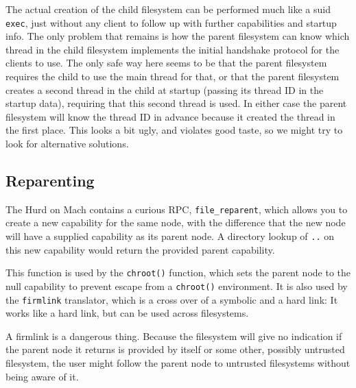 The actual creation of the child filesystem can be performed much like
a suid \texttt{exec}, just without any client to follow up with
further capabilities and startup info.  The only problem that remains
is how the parent filesystem can know which thread in the child
filesystem implements the initial handshake protocol for the clients
to use.  The only safe way here seems to be that the parent filesystem
requires the child to use the main thread for that, or that the parent
filesystem creates a second thread in the child at startup (passing
its thread ID in the startup data), requiring that this second thread
is used.  In either case the parent filesystem will know the thread ID
in advance because it created the thread in the first place.  This
looks a bit ugly, and violates good taste, so we might try to look for
alternative solutions.


\subsection{Reparenting}
\label{reparenting}

The Hurd on Mach contains a curious RPC, \verb/file_reparent/, which
allows you to create a new capability for the same node, with the
difference that the new node will have a supplied capability as its
parent node.  A directory lookup of \texttt{..} on this new capability
would return the provided parent capability.

This function is used by the \texttt{chroot()} function, which sets
the parent node to the null capability to prevent escape from a
\texttt{chroot()} environment.  It is also used by the
\texttt{firmlink} translator, which is a cross over of a symbolic and
a hard link: It works like a hard link, but can be used across
filesystems.

A firmlink is a dangerous thing.  Because the filesystem will give no
indication if the parent node it returns is provided by itself or some
other, possibly untrusted filesystem, the user might follow the parent
node to untrusted filesystems without being aware of it.


